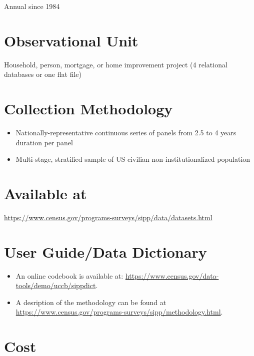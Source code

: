 \documentclass[
]{book}
\providecommand{\tightlist}{%
  \setlength{\itemsep}{0pt}\setlength{\parskip}{0pt}}
\begin{document}
Annual since 1984

\hypertarget{observational-unit-87}{%
\section{Observational Unit}\label{observational-unit-87}}

Household, person, mortgage, or home improvement project (4 relational databases or one flat file)

\hypertarget{collection-methodology-87}{%
\section{Collection Methodology}\label{collection-methodology-87}}

\begin{itemize}
\tightlist
\item
  Nationally-representative continuous series of panels from 2.5 to 4 years duration per panel
\item
  Multi-stage, stratified sample of US civilian non-institutionalized population
\end{itemize}

\hypertarget{available-at-87}{%
\section{Available at}\label{available-at-87}}

\url{https://www.census.gov/programs-surveys/sipp/data/datasets.html}

\hypertarget{user-guidedata-dictionary-87}{%
\section{User Guide/Data Dictionary}\label{user-guidedata-dictionary-87}}

\begin{itemize}
\tightlist
\item
  An online codebook is available at: \url{https://www.census.gov/data-tools/demo/uccb/sippdict}.
\item
  A desription of the methodology can be found at \url{https://www.census.gov/programs-surveys/sipp/methodology.html}.
\end{itemize}

\hypertarget{cost-87}{%
\section{Cost}\label{cost-87}}
\end{document}

